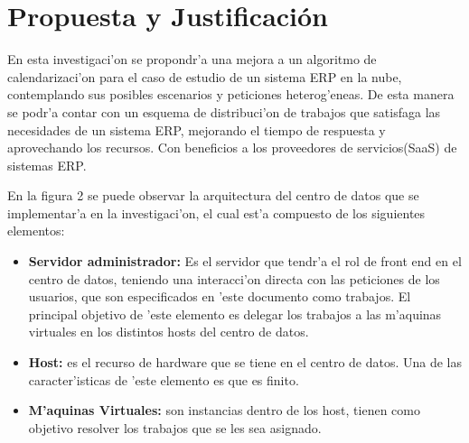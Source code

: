 
\chapter*{Propuesta y Justificaci\'on}



En esta investigaci'on se propondr'a una mejora a un algoritmo de calendarizaci'on para el caso de estudio de un sistema ERP en la nube, contemplando sus posibles escenarios y peticiones heterog'eneas. De esta manera se podr'a contar con un esquema de distribuci'on de trabajos que satisfaga las necesidades de un sistema ERP, mejorando el tiempo de respuesta y aprovechando los recursos. Con beneficios a los proveedores de servicios(SaaS) de sistemas ERP.



En la figura 2 se puede observar la arquitectura del centro de datos que se implementar'a en la investigaci'on, el cual est'a compuesto de los siguientes elementos:

\begin{itemize}
\item \textbf{Servidor administrador:} Es el servidor que tendr'a el rol de front end en el centro de datos, teniendo una interacci'on directa con las peticiones de los usuarios, que son especificados en 'este documento como trabajos.
El principal objetivo de 'este elemento es delegar los trabajos a las m'aquinas virtuales en los distintos hosts del centro de datos.
\item \textbf{Host:} es el recurso de hardware que se tiene en el centro de datos. Una de las caracter'isticas de 'este elemento es que es finito.
\item \textbf{M'aquinas Virtuales:} son instancias dentro de los host, tienen como objetivo resolver los trabajos que se les sea asignado.


\end{itemize}